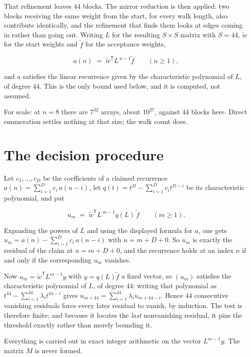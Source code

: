 \documentclass[11pt]{article}
\theoremstyle{definition}
\begin{document}
That refinement leaves $44$ blocks. The mirror reduction is then applied: two blocks receiving the same weight from the start, for every walk length, also contribute identically, and the refinement that finds them looks at edges coming in rather than going out. Writing $L$ for the resulting $S \times S$ matrix with $S = 44$, $\tilde w$ for the start weights and $\tilde f$ for the acceptance weights,

\[a(n) \;=\; \tilde w^{\mathsf T} L^{\,n-1} \tilde f \qquad (n \ge 1),\]

and $a$ satisfies the linear recurrence given by the characteristic polynomial of $L$, of degree $44$. This is the only bound used below, and it is computed, not assumed.

For scale: at $n = 8$ there are $7^{32}$ arrays, about $10^{27}$, against $44$ blocks here. Direct enumeration settles nothing at that size; the walk count does.

\section{The decision procedure}

Let $c_1,\dots,c_D$ be the coefficients of a claimed recurrence $a(n) = \sum_{i=1}^{D} c_i\,a(n-i)$, let $q(t) = t^{D} - \sum_{i=1}^{D} c_i t^{D-i}$ be its characteristic polynomial, and put

\[u_m \;=\; \tilde w^{\mathsf T} L^{\,m-1} q(L)\,\tilde f \qquad (m \ge 1).\]

Expanding the powers of $L$ and using the displayed formula for $a$, one gets $u_m = a(n) - \sum_{i=1}^{D} c_i\,a(n-i)$ with $n = m + D + 0$. So $u_m$ is exactly the residual of the claim at $n = m + D + 0$, and the recurrence holds at an index $n$ if and only if the corresponding $u_m$ vanishes.

Now $u_m = \tilde w^{\mathsf T} L^{m-1} y$ with $y = q(L)\tilde f$ a fixed vector, so $(u_m)$ satisfies the characteristic polynomial of $L$, of degree $44$: writing that polynomial as $t^{44} - \sum_{i=1}^{44} \lambda_i t^{44-i}$ gives $u_{m+44} = \sum_{i=1}^{44} \lambda_i u_{m+44-i}$. Hence $44$ consecutive vanishing residuals force every later residual to vanish, by induction. The test is therefore finite; and because it locates the {\itshape last} nonvanishing residual, it pins the threshold exactly rather than merely bounding it.

Everything is carried out in exact integer arithmetic on the vector $L^{m-1}y$. The matrix $M$ is never formed.
\end{document}
